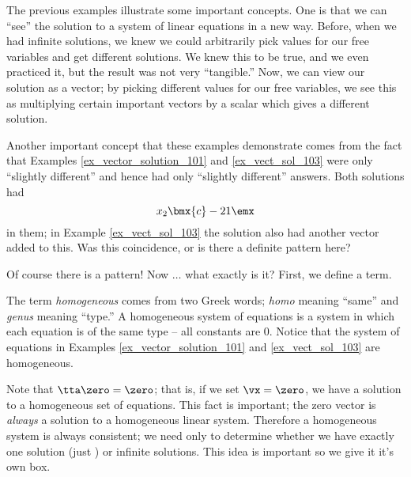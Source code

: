 The previous examples illustrate some important concepts. One is that we can ``see'' the solution to a system of linear equations in a new way. Before, when we had infinite solutions, we knew we could arbitrarily pick values for our free variables and get different solutions. We knew this to be true, and we even practiced it, but the result was not very ``tangible.'' Now, we can view our solution as a vector; by picking different values for our free variables, we see this as multiplying certain important vectors by a scalar which gives a different solution.

Another important concept that these examples demonstrate comes from the fact that Examples \ref{ex_vector_solution_101} and \ref{ex_vect_sol_103} were only ``slightly different'' and hence had only ``slightly different'' answers. Both solutions had 
\[
x_2\bmx{c}-2\\1\emx
\]
in them; in Example \ref{ex_vect_sol_103} the solution also had another vector added to this. Was this coincidence, or is there a definite pattern here?

Of course there is a pattern! Now $\ldots$ what exactly is it? First, we define a term.

\smallskip


\smallskip

The term \textit{homogeneous} comes from two Greek words; \textit{homo} meaning ``same'' and \textit{genus} meaning ``type.'' A homogeneous system of equations is a system in which each equation is of the same type -- all constants are 0. Notice that the system of equations in Examples \ref{ex_vector_solution_101} and \ref{ex_vect_sol_103} are homogeneous.

Note that $\tta\zero = \zero$; that is, if we set $\vx = \zero$, we have a solution to a homogeneous set of equations. This fact is important; the zero vector is \textit{always} a solution to a homogeneous linear system. Therefore a homogeneous system is always consistent; we need only to determine whether we have exactly one solution (just \zero) or infinite solutions. This idea is important so we give it it's own box.

